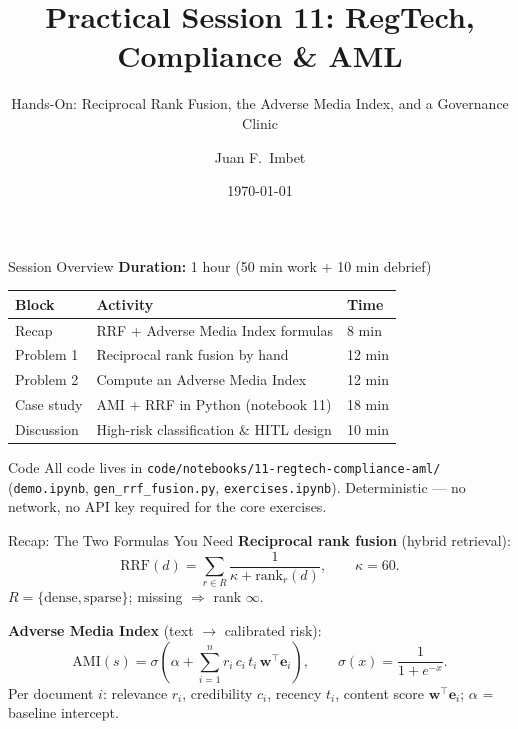 \documentclass[9pt,t]{beamer}
\title{Practical Session 11: RegTech, Compliance \& AML}
\subtitle{Hands-On: Reciprocal Rank Fusion, the Adverse Media Index, and a Governance Clinic}
\author{Juan F.\ Imbet}
\institute{Paris Dauphine -- PSL University}
\date{\today}
\begin{document}
\begin{frame}\titlepage\end{frame}

\begin{frame}{Session Overview}
\textbf{Duration:} 1 hour (50 min work + 10 min debrief)

\medskip
\begin{tabular}{lll}
\toprule
\textbf{Block} & \textbf{Activity} & \textbf{Time} \\
\midrule
Recap     & RRF + Adverse Media Index formulas       & 8 min \\
Problem 1 & Reciprocal rank fusion by hand           & 12 min \\
Problem 2 & Compute an Adverse Media Index           & 12 min \\
Case study& AMI + RRF in Python (notebook 11)        & 18 min \\
Discussion& High-risk classification \& HITL design  & 10 min \\
\bottomrule
\end{tabular}

\medskip
\begin{block}{Code}
All code lives in \texttt{code/notebooks/11-regtech-compliance-aml/}
(\texttt{demo.ipynb}, \texttt{gen\_rrf\_fusion.py}, \texttt{exercises.ipynb}).
Deterministic --- no network, no API key required for the core exercises.
\end{block}
\end{frame}

\begin{frame}{Recap: The Two Formulas You Need}
\textbf{Reciprocal rank fusion} (hybrid retrieval):
\[
\mathrm{RRF}(d) = \sum_{r \in R} \frac{1}{\kappa + \mathrm{rank}_r(d)},
\qquad \kappa = 60.
\]
$R = \{\text{dense}, \text{sparse}\}$; missing $\Rightarrow$ rank $\infty$.

\medskip
\textbf{Adverse Media Index} (text $\to$ calibrated risk):
\[
\mathrm{AMI}(s) = \sigma\!\left(\alpha + \sum_{i=1}^{n} r_i\, c_i\, t_i\,
\mathbf{w}^{\top}\mathbf{e}_i\right), \qquad \sigma(x) = \frac{1}{1+e^{-x}}.
\]
Per document $i$: relevance $r_i$, credibility $c_i$, recency $t_i$, content
score $\mathbf{w}^{\top}\mathbf{e}_i$; $\alpha$ = baseline intercept.
\end{frame}
\end{document}
